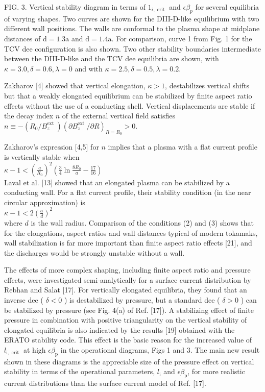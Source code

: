 \documentclass[10pt]{article}
\begin{document}
FIG. 3. Vertical stability diagram in terms of $1_{i, \text { crit }}$ and $\epsilon \beta_{p}$ for several equilibria of varying shapes. Two curves are shown for the DIII-D-like equilibrium with two different wall positions. The walls are conformal to the plasma shape at midplane distances of $\mathrm{d}=1.3 \mathrm{a}$ and $\mathrm{d}=1.4 \mathrm{a}$. For comparison, curve 1 from Fig. 1 for the TCV dee configuration is also shown. Two other stability boundaries intermediate between the DIII-D-like and the TCV dee equilibria are shown, with $\kappa=3.0, \delta=0.6, \lambda=0$ and with $\kappa=2.5, \delta=0.5, \lambda=0.2$.

Zakharov [4] showed that vertical elongation, $\kappa>1$, destabilizes vertical shifts but that a weakly elongated equilibrium can be stabilized by finite aspect ratio effects without the use of a conducting shell. Vertical displacements are stable if the decay index $n$ of the external vertical field satisfies $n \equiv-\left(R_{0} / B_{z}^{\text {ext }}\right)\left(\partial B_{z}^{\text {ext }} / \partial R\right)_{R=R_{0}}>0$.

Zakharov's expression [4,5] for $n$ implies that a plasma with a flat current profile is vertically stable when\\
$\kappa-1<\left(\frac{a}{R_{0}}\right)^{2}\left(\frac{3}{4} \ln \frac{8 R_{0}}{a}-\frac{17}{16}\right)$\\[0pt]
Laval et al. [13] showed that an elongated plasma can be stabilized by a conducting wall. For a flat current profile, their stability condition (in the near circular approximation) is\\
$\kappa-1<2\left(\frac{a}{d}\right)^{2}$\\
where $d$ is the wall radius. Comparison of the conditions (2) and (3) shows that for the elongations, aspect ratios and wall distances typical of modern tokamaks, wall stabilization is far more important than finite aspect ratio effects [21], and the discharges would be strongly unstable without a wall.

The effects of more complex shaping, including finite aspect ratio and pressure effects, were investigated semi-analytically for a surface current distribution by Rebhan and Salat [17]. For vertically elongated equilibria, they found that an inverse dee ( $\delta<0$ ) is destabilized by pressure, but a standard dee ( $\delta>0$ ) can be stabilized by pressure (see Fig. 4(a) of Ref. [17]). A stabilizing effect of finite pressure in combination with positive triangularity on the vertical stability of elongated equilibria is also indicated by the results [19] obtained with the ERATO stability code. This effect is the basic reason for the increased value of $l_{\mathrm{i}, \text { crit }}$ at high $\epsilon \beta_{\mathrm{p}}$ in the operational diagrams, Figs 1 and 3. The main new result shown in these diagrams is the appreciable size of the pressure effect on vertical stability in terms of the operational parameters, $l_{\mathrm{i}}$ and $\epsilon \beta_{\mathrm{p}}$, for more realistic current distributions than the surface current model of Ref. [17].
\end{document}
